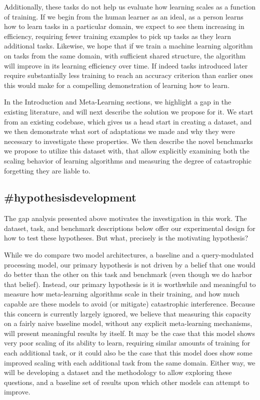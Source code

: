 Additionally, these tasks do not help us evaluate how learning scales as a function of training. If we begin from the human learner as an ideal, as a person learns how to learn tasks in a particular domain, we expect to see them increasing in efficiency, requiring fewer training examples to pick up tasks as they learn additional tasks. Likewise, we hope that if we train a machine learning algorithm on tasks from the same domain, with sufficient shared structure, the algorithm will improve in its learning efficiency over time. If indeed tasks introduced later require substantially less training to reach an accuracy criterion than earlier ones this would make for a compelling demonstration of learning how to learn.

In the Introduction and Meta-Learning sections, we highlight a gap in the existing literature, and will next describe the solution we propose for it. We start from an existing codebase, which gives us a head start in creating a dataset, and we then demonstrate what sort of adaptations we made and why they were necessary to investigate these properties. We then describe the novel benchmarks we propose to utilize this dataset with, that allow explicitly examining both the scaling behavior of learning algorithms and measuring the degree of catastrophic forgetting they are liable to. 

\subsection{\#hypothesisdevelopment}
The gap analysis presented above motivates the investigation in this work. The dataset, task, and benchmark descriptions below offer our experimental design for how to test these hypotheses. But what, precisely is the motivating hypothesis? 

While we do compare two model architectures, a baseline and a query-modulated processing model, our primary hypothesis is not driven by a belief that one would do better than the other on this task and benchmark (even though we do harbor that belief). Instead, our primary hypothesis is it is worthwhile and meaningful to measure how meta-learning algorithms scale in their training, and how much capable are these models to avoid (or mitigate) catastrophic interference. Because this concern is currently largely ignored, we believe that measuring this capacity on a fairly naive baseline model, without any explicit meta-learning mechanisms, will present meaningful results by itself. It may be the case that this model shows very poor scaling of its ability to learn, requiring similar amounts of training for each additional task, or it could also be the case that this model does show some improved scaling with each additional task from the same domain. Either way, we will be developing a dataset and the methodology to allow exploring these questions, and a baseline set of results upon which other models can attempt to improve. 

